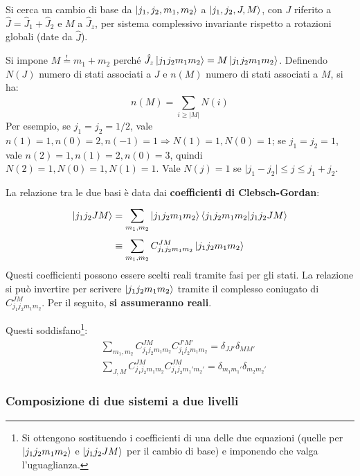 \documentclass[10pt, a4paper]{scrartcl} %
\numberwithin{equation}{subsection}
\theoremstyle{style2}
\theoremstyle{style1}
\begin{document}
Si cerca un cambio di base da $\ket{j_1,j_2,m_1,m_2} $ a $\ket{j_1,j_2,J,M} $, con $J$ riferito a $\hat{J} = \hat{J}_1 + \hat{J}_2$ e $M$ a $\hat{J}_z$, per sistema complessivo invariante rispetto a rotazioni globali (date da $\hat{J}$).

Si impone $M \stackrel{!}{=} m_1+m_2$ perch\'e $\hat{J}_z \ket{j_1j_2m_1m_2} = M \ket{j_1j_2m_1m_2} $. Definendo $N(J)$ numero di stati associati a $J$ e $n(M)$ numero di stati associati a $M$, si ha:
\begin{equation}
	n(M) = \sum_{i\ge |M|}^{} N(i)
\end{equation}
Per esempio, se $j_1=j_2=1 / 2$, vale $n(1) = 1, n(0) = 2, n(-1) = 1\Rightarrow N(1) = 1, N(0) =1$; se $j_1=j_2=1$, vale $n(2) = 1, n(1) = 2, n(0) = 3$, quindi $N(2) = 1, N(0) = 1, N(1) = 1$. Vale $N(j) = 1 $ se $\lvert j_1-j_2 \rvert \le j \le j_1+j_2$.

La relazione tra le due basi \`e  data dai \textbf{coefficienti di Clebsch-Gordan}:
\begin{equation}
	\begin{split}
		\ket{j_1 j_2 J M } &= \sum_{m_1,m_2}^{} \ket{j_1j_2m_1m_2} \braket{j_1j_2m_1m_2|j_1j_2JM} \\
				   &\equiv \sum_{m_1,m_2}^{} C^{JM} _{j_1j_2m_1m_2} \ket{j_1j_2m_1m_2} 
	\end{split}
\end{equation}
Questi coefficienti possono essere scelti reali tramite fasi per gli stati. La relazione si pu\`o invertire per scrivere $\ket{j_1j_2m_1m_2} $ tramite il complesso coniugato di $C^{JM} _{j_1j_2m_1m_2} $. 
Per il seguito, \textbf{si assumeranno reali}.

Questi soddisfano\footnote{Si ottengono sostituendo i coefficienti di una delle due equazioni (quelle per $\ket{j_1j_2m_1m_2} $ e $\ket{j_1j_2JM} $ per il cambio di base) e imponendo che valga l'uguaglianza.}:
\begin{equation}
	\begin{split}
	&\sum_{m_1,m_2}^{} C^{JM} _{j_1j_2m_1m_2} C^{J'M'} _{j_1j_2m_1m_2} = \delta _{JJ'} \delta _{MM'} \\
	&\sum_{J,M}^{} C^{JM} _{j_1j_2m_1m_2} C^{JM} _{j_1j_2m_1'm_2'} = \delta _{m_1m_1'} \delta _{m_2m_2'}
	\end{split}
\end{equation}

\subsubsection{Composizione di due sistemi a due livelli}
\end{document}
